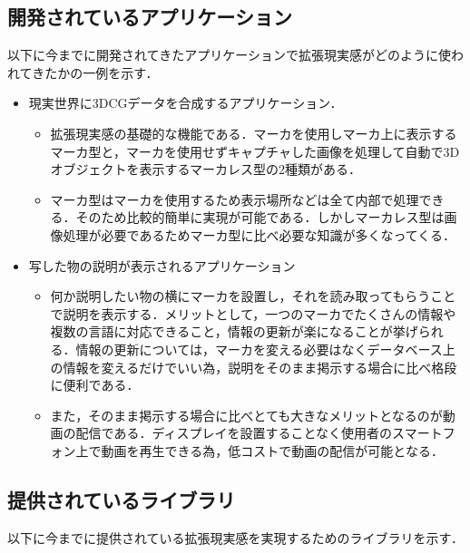 \subsection{開発されているアプリケーション}
以下に今までに開発されてきたアプリケーションで拡張現実感がどのように使われてきたかの一例を示す．
\begin{itemize}
 \item 現実世界に3DCGデータを合成するアプリケーション．\\
       \begin{itemize}
	\item 拡張現実感の基礎的な機能である．マーカを使用しマーカ上に表示するマーカ型と，マーカを使用せずキャプチャした画像を処理して自動で3Dオブジェクトを表示するマーカレス型の2種類がある．
	\item マーカ型はマーカを使用するため表示場所などは全て内部で処理できる．そのため比較的簡単に実現が可能である．しかしマーカレス型は画像処理が必要であるためマーカ型に比べ必要な知識が多くなってくる．
       \end{itemize}
       \newpage
 \item 写した物の説明が表示されるアプリケーション
       \begin{itemize}
	\item 何か説明したい物の横にマーカを設置し，それを読み取ってもらうことで説明を表示する．メリットとして，一つのマーカでたくさんの情報や複数の言語に対応できること，情報の更新が楽になることが挙げられる．情報の更新については，マーカを変える必要はなくデータベース上の情報を変えるだけでいい為，説明をそのまま掲示する場合に比べ格段に便利である．
	\item また，そのまま掲示する場合に比べとても大きなメリットとなるのが動画の配信である．ディスプレイを設置することなく使用者のスマートフォン上で動画を再生できる為，低コストで動画の配信が可能となる．
       \end{itemize}
\end{itemize}
\vspace{5pt}

\subsection{提供されているライブラリ}
以下に今までに提供されている拡張現実感を実現するためのライブラリを示す．

